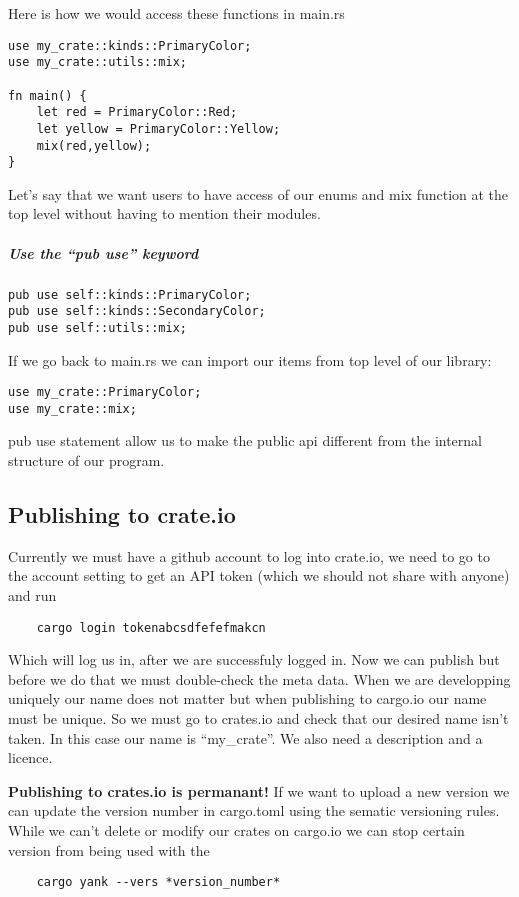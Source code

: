 Here is how we would access these functions in main.rs\begin{lstlisting}
use my_crate::kinds::PrimaryColor;
use my_crate::utils::mix;

fn main() {
    let red = PrimaryColor::Red;
    let yellow = PrimaryColor::Yellow;
    mix(red,yellow);
}
\end{lstlisting}
Let's say that we want users to have access of our enums and mix function at the top level without having to mention their modules.

\subparagraph*{Use the ``pub use'' keyword}\begin{lstlisting}
pub use self::kinds::PrimaryColor;
pub use self::kinds::SecondaryColor;
pub use self::utils::mix;
\end{lstlisting}

If we go back to main.rs we can import our items from top level of our library:\begin{lstlisting}
use my_crate::PrimaryColor;
use my_crate::mix;
\end{lstlisting}

pub use statement allow us to make the public api different from the internal structure of our program.

\subsection{Publishing to crate.io}
Currently we must have a github account to log into crate.io, we need to go to the account setting to get an API token (which we should not share with anyone) and run \begin{lstlisting}
    cargo login tokenabcsdfefefmakcn
\end{lstlisting} 

Which will log us in, after we are successfuly logged in. Now we can publish but before we do that we must double-check the meta data. When we are developping uniquely our name does not matter but when publishing to cargo.io our name must be unique. 
So we must go to crates.io and check that our desired name isn't taken. In this case our name is ``my\_crate''. We also need a description and a licence.


\textbf{Publishing to crates.io is permanant!} If we want to upload a new version we can update the version number in cargo.toml using the sematic versioning rules. While we can't delete or modify our crates on cargo.io we can stop certain version from being used with the \begin{lstlisting}
    cargo yank --vers *version_number*
\end{lstlisting}

